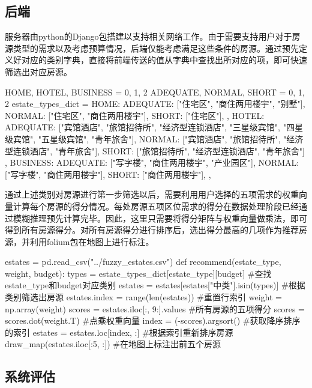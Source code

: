 \documentclass{article}
\begin{document}
\subsection{后端}

服务器由python的Django包搭建以支持相关网络工作。由于需要支持用户对于房源类型的需求以及考虑预算情况，后端仅能考虑满足这些条件的房源。通过预先定义好对应的类别字典，直接将前端传送的值从字典中查找出所对应的项，即可快速筛选出对应房源。

\begin{python}
HOME, HOTEL, BUSINESS = 0, 1, 2
ADEQUATE, NORMAL, SHORT = 0, 1, 2
estate_types_dict = {
    HOME: {
        ADEQUATE: ["住宅区", "商住两用楼宇", "别墅"],
        NORMAL: ["住宅区", "商住两用楼宇"],
        SHORT: ["住宅区"],
    },
    HOTEL: {
        ADEQUATE: ["宾馆酒店", "旅馆招待所", "经济型连锁酒店", "三星级宾馆", "四星级宾馆", "五星级宾馆", "青年旅舍"],
        NORMAL: ["宾馆酒店", "旅馆招待所", "经济型连锁酒店", "青年旅舍"],
        SHORT: ["旅馆招待所", "经济型连锁酒店", "青年旅舍"]
    },
    BUSINESS: {
        ADEQUATE: ["写字楼", "商住两用楼宇", "产业园区"],
        NORMAL: ["写字楼", "商住两用楼宇"],
        SHORT: ["商住两用楼宇"],
    },
}
\end{python}

通过上述类别对房源进行第一步筛选以后，需要利用用户选择的五项需求的权重向量计算每个房源的得分情况。每处房源五项区位需求的得分在数据处理阶段已经通过模糊推理预先计算完毕。因此，这里只需要将得分矩阵与权重向量做乘法，即可得到所有房源得分。对所有房源得分进行排序后，选出得分最高的几项作为推荐房源，并利用folium包在地图上进行标注。

\begin{python}
estates = pd.read_csv("../fuzzy_estates.csv")
def recommend(estate_type, weight, budget):
    types = estate_types_dict[estate_type][budget] #查找estate_type和budget对应类别
    estates = estates[estates["中类"].isin(types)] #根据类别筛选出房源
    estates.index = range(len(estates)) #重置行索引
    weight = np.array(weight)
    scores = estates.iloc[:, 9:].values #所有房源的五项得分
    scores = scores.dot(weight.T) #点乘权重向量
    index = (-scores).argsort() #获取降序排序的索引
    estates = estates.loc[index, :] #根据索引重新排序房源
    draw_map(estates.iloc[:5, :]) #在地图上标注出前五个房源
\end{python}

\subsection{系统评估}
\end{document}
